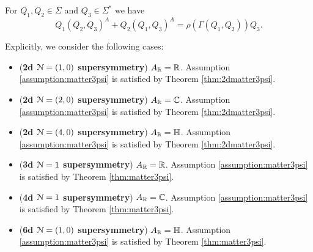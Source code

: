 \documentclass[10pt, oneside]{article}
\begin{document}
\begin{assumption}
For $Q_1, Q_2\in\Sigma$ and $Q_3\in\Sigma^*$ we have
\[Q_1(Q_2, Q_3)^A + Q_2(Q_1, Q_3)^A = \rho(\Gamma(Q_1, Q_2))Q_3.\]
\label{assumption:matter3psi}
\end{assumption}

Explicitly, we consider the following cases:
\begin{itemize}
\item (\textbf{2d $\mathcal N=(1, 0)$ supersymmetry}) $A_\mathbb R = \mathbb R$. Assumption \ref{assumption:matter3psi} is satisfied by Theorem \ref{thm:2dmatter3psi}.

\item (\textbf{2d $\mathcal N=(2, 0)$ supersymmetry}) $A_\mathbb R = \mathbb C$. Assumption \ref{assumption:matter3psi} is satisfied by Theorem \ref{thm:2dmatter3psi}.

\item (\textbf{2d $\mathcal N=(4, 0)$ supersymmetry}) $A_\mathbb R = \mathbb{H}$. Assumption \ref{assumption:matter3psi} is satisfied by Theorem \ref{thm:2dmatter3psi}.

\item (\textbf{3d $\mathcal N=1$ supersymmetry}) $A_\mathbb R = \mathbb R$. Assumption \ref{assumption:matter3psi} is satisfied by Theorem \ref{thm:matter3psi}.

\item (\textbf{4d $\mathcal N=1$ supersymmetry}) $A_\mathbb R = \mathbb C$. Assumption \ref{assumption:matter3psi} is satisfied by Theorem \ref{thm:matter3psi}.

\item (\textbf{6d $\mathcal N=(1, 0)$ supersymmetry}) $A_\mathbb R = \mathbb{H}$. Assumption \ref{assumption:matter3psi} is satisfied by Theorem \ref{thm:matter3psi}.
\end{itemize}
\end{document}
